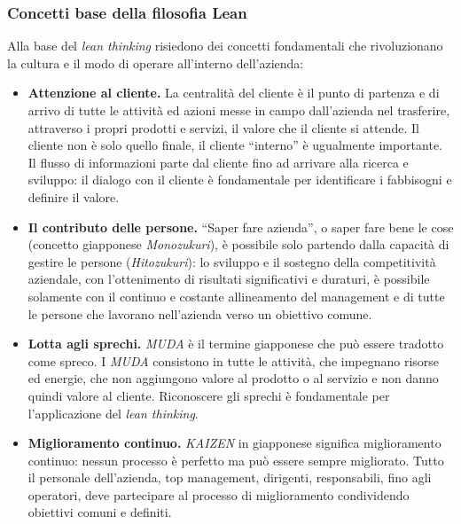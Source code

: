 \subsubsection{Concetti base della filosofia Lean}
Alla base del \textit{lean thinking} risiedono dei concetti fondamentali che rivoluzionano la cultura e il modo di operare all’interno dell’azienda:
\begin{itemize}
	\item \textbf{Attenzione al cliente.} La centralità del cliente è il punto di partenza e di arrivo di tutte le attività ed azioni messe in campo dall’azienda nel trasferire, attraverso i propri prodotti e servizi, il valore che il cliente si attende. Il cliente non è solo quello finale, il cliente “interno” è ugualmente importante. Il flusso di informazioni parte dal cliente fino ad arrivare alla ricerca e sviluppo: il dialogo con il cliente è fondamentale per identificare i fabbisogni e definire il valore.
	\item \textbf{Il contributo delle persone.} “Saper fare azienda”, o saper fare bene le cose (concetto giapponese \textit{Monozukuri}), è possibile solo partendo dalla capacità di gestire le persone (\textit{Hitozukuri}): lo sviluppo e il sostegno della competitività aziendale, con l’ottenimento di risultati significativi e duraturi, è possibile solamente con il continuo e costante allineamento del management e di tutte le persone che lavorano nell’azienda verso un obiettivo comune.
	\item \textbf{Lotta agli sprechi.} \textit{MUDA} è il termine giapponese che può essere tradotto come spreco. I \textit{MUDA} consistono in tutte le attività, che impegnano risorse ed energie, che non aggiungono valore al prodotto o al servizio e non danno quindi valore al cliente. Riconoscere gli sprechi è fondamentale per l’applicazione del \textit{lean thinking}.
	\item \textbf{Miglioramento continuo.} \textit{KAIZEN} in giapponese significa miglioramento continuo: nessun processo è perfetto ma può essere sempre migliorato. Tutto il personale dell’azienda, top management, dirigenti, responsabili, fino agli operatori, deve partecipare al processo di miglioramento condividendo obiettivi comuni e definiti.
\end{itemize}

